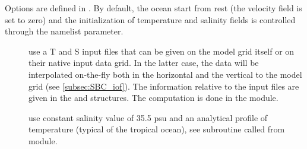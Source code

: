 \documentclass[../main/NEMO_manual]{subfiles}
\begin{document}
Options are defined in .
By default, the ocean start from rest (the velocity field is set to zero) and the initialization of temperature and salinity fields is controlled through the  namelist parameter.
\begin{description}
\item[]
  use a T and S input files that can be given on the model grid itself or on their native input data grid.
  In the latter case,
  the data will be interpolated on-the-fly both in the horizontal and the vertical to the model grid
  (see \autoref{subsec:SBC_iof}).
  The information relative to the input files are given in the  and  structures.
  The computation is done in the  module.
\item[]
  use constant salinity value of 35.5 psu and an analytical profile of temperature (typical of the tropical ocean),
  see  subroutine called from  module.
\end{description}

\biblio
\end{document}
